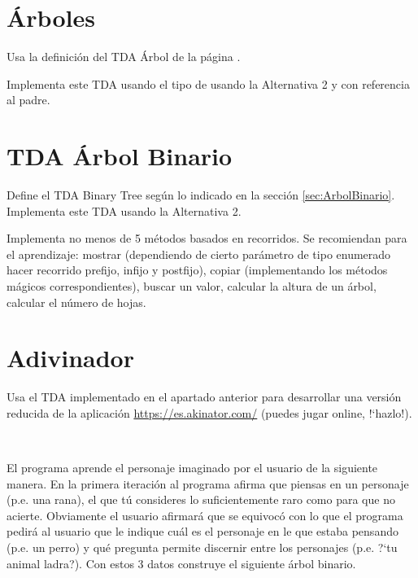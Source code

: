 \section{Árboles} 

Usa la definición del TDA Árbol de la página \pageref{def:arbol}.

Implementa este TDA usando el tipo  de  usando la Alternativa 2 y con referencia al padre. 


%



\separacion
\section{TDA Árbol Binario} 

Define el TDA Binary Tree según lo indicado en la sección \ref{sec:ArbolBinario}.
Implementa este TDA usando la Alternativa 2.

Implementa no menos de 5 métodos basados en recorridos. Se recomiendan para el aprendizaje: mostrar (dependiendo de cierto parámetro de tipo enumerado hacer recorrido prefijo, infijo y postfijo), copiar (implementando los métodos mágicos correspondientes), buscar un valor, calcular la altura de un árbol, calcular el número de hojas.



\separacion
\section{Adivinador} 

Usa el TDA implementado en el apartado anterior para desarrollar una versión reducida de la aplicación \url{https://es.akinator.com/} (puedes jugar online, !`hazlo!).

\


El programa aprende el personaje imaginado por el usuario de la siguiente manera.
En la primera iteración al programa afirma que piensas en un personaje (p.e. una rana), el que tú consideres lo suficientemente raro como para que no acierte.
Obviamente el usuario afirmará que se equivocó con lo que el programa pedirá al usuario que le indique cuál es el personaje en le que estaba pensando (p.e. un perro) y  qué pregunta permite discernir entre los personajes (p.e. ?`tu animal ladra?). Con estos 3 datos construye el siguiente árbol binario.

